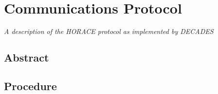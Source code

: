 

\chapter{Communications Protocol}
\begin{center}
{\small\em A description of the HORACE protocol as implemented by DECADES}
\end{center}

\section{Abstract}

\section{Procedure}
\newpage
